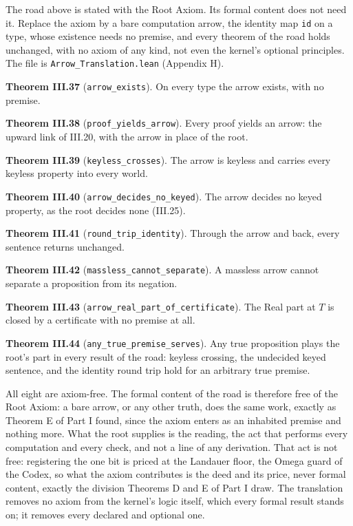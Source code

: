 \documentclass[10pt,twocolumn]{article}
\begin{document}
The road above is stated with the Root Axiom. Its formal content does
not need it. Replace the axiom by a bare computation arrow, the identity
map \texttt{id} on a type, whose existence needs no premise, and every
theorem of the road holds unchanged, with no axiom of any kind, not even
the kernel's optional principles. The file is
\texttt{Arrow\_Translation.lean} (Appendix H).

\textbf{Theorem III.37} (\texttt{arrow\_exists}). On every type the
arrow exists, with no premise.

\textbf{Theorem III.38} (\texttt{proof\_yields\_arrow}). Every proof
yields an arrow: the upward link of III.20, with the arrow in place of
the root.

\textbf{Theorem III.39} (\texttt{keyless\_crosses}). The arrow is
keyless and carries every keyless property into every world.

\textbf{Theorem III.40} (\texttt{arrow\_decides\_no\_keyed}). The arrow
decides no keyed property, as the root decides none (III.25).

\textbf{Theorem III.41} (\texttt{round\_trip\_identity}). Through the
arrow and back, every sentence returns unchanged.

\textbf{Theorem III.42} (\texttt{massless\_cannot\_separate}). A
massless arrow cannot separate a proposition from its negation.

\textbf{Theorem III.43} (\texttt{arrow\_real\_part\_of\_certificate}).
The Real part at \(T\) is closed by a certificate with no premise at
all.

\textbf{Theorem III.44} (\texttt{any\_true\_premise\_serves}). Any true
proposition plays the root's part in every result of the road: keyless
crossing, the undecided keyed sentence, and the identity round trip hold
for an arbitrary true premise.

All eight are axiom-free. The formal content of the road is therefore
free of the Root Axiom: a bare arrow, or any other truth, does the same
work, exactly as Theorem E of Part I found, since the axiom enters as an
inhabited premise and nothing more. What the root supplies is the
reading, the act that performs every computation and every check, and
not a line of any derivation. That act is not free: registering the one
bit is priced at the Landauer floor, the Omega guard of the Codex, so
what the axiom contributes is the deed and its price, never formal
content, exactly the division Theorems D and E of Part I draw. The
translation removes no axiom from the kernel's logic itself, which every
formal result stands on; it removes every declared and optional one.
\end{document}
